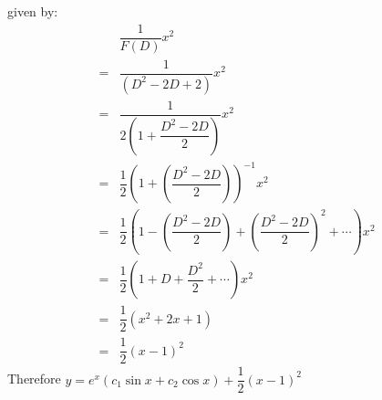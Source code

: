 \documentclass[a4paper, titlepage]{article}
\begin{document}
\begin{enumerate}[label=\textbf{\Roman*}]
            given by: 
            \begin{align*}
                & \dfrac{1}{F(D)}x^2 \\
               =& \dfrac{1}{(D^2 - 2D + 2)}x^2 \\
               =& \dfrac{1}{2\left(1 + \dfrac{D^2 - 2D}{2} \right)}x^2 \\
               =& \dfrac{1}{2} \left(1 + \left(\dfrac{D^2 - 2D}{2}\right) \right)^{-1}x^2 \\
               =& \dfrac{1}{2} \left(1 - \left(\dfrac{D^2 - 2D}{2}\right) + \left(\dfrac{D^2 - 2D}{2}\right)^2 + \cdots \right)x^2 \\
               =& \dfrac{1}{2} \left(1 + D + \dfrac{D^2}{2} + \cdots \right)x^2 \\
               =& \dfrac{1}{2} \left(x^2 + 2x + 1 \right) \\
               =& \dfrac{1}{2} \left(x - 1 \right)^2 
            \end{align*} 
            Therefore $y = e^x(c_1\sin x + c_2\cos x) + \dfrac{1}{2} \left(x - 1 \right)^2$
            

\end{enumerate}
\end{document}
